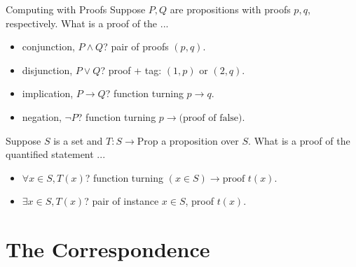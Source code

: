 \documentclass{beamer}
\begin{document}
\begin{frame}{Computing with Proofs}
 Suppose $P, Q$ are propositions with proofs $p, q$, respectively. What is a
 proof of the ... 
 \begin{itemize}
   \item conjunction, $P \wedge Q$? \pause \hfill {\small pair of proofs $(p, q)$.}
     \pause
   \item disjunction, $P \vee Q$? \pause \hfill {\small proof + tag: $(1, p)$ or
   $(2, q)$.}
   \pause
 \item implication, $P \to Q$? \pause \hfill {\small function turning $p \to q$.} 
  \pause
 \item negation, $\neg P$? \pause \hfill {\small function turning $p \to
   \text{(proof of false)}$.} 
 \end{itemize}
\pause
 Suppose $S$ is a set and $T : S \to \text{Prop}$ a proposition over $S$. What
 is a proof of the quantified statement ...
 \begin{itemize}
   \item  $\forall x \in S, T(x)$? \pause \hfill {\small
     function turning $(x \in S) \to \text{proof }t(x)$.}
    \pause
   \item  $\exists x \in S, T(x)$? \pause \hfill {\small
     pair of instance $x \in S$, proof $t(x)$.}
 \end{itemize}

\end{frame}


\section{The Correspondence}
\end{document}
